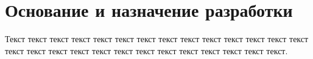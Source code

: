 \vspace{1cm}
\section{Основание и назначение разработки}\label{section:Основание и назначение разработки}

Текст текст текст текст текст текст текст текст текст текст текст текст текст текст текст текст текст текст текст текст текст текст текст текст текст текст текст.